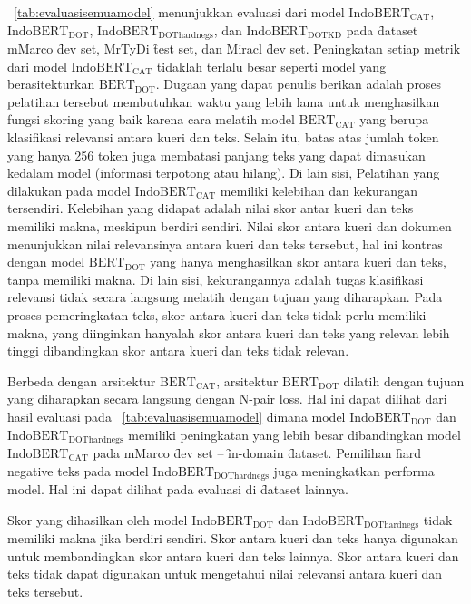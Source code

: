 \tab~\ref{tab:evaluasisemuamodel} menunjukkan evaluasi dari model $\text{IndoBERT}_{\text{CAT}}$, $\text{IndoBERT}_{\text{DOT}}$, $\text{IndoBERT}_{\text{DOThardnegs}}$, dan $\text{IndoBERT}_{\text{DOTKD}}$ pada \f{dataset} mMarco \f{dev set}, MrTyDi \f{test set}, dan Miracl \f{dev set}. Peningkatan setiap metrik dari model $\text{IndoBERT}_{\text{CAT}}$ tidaklah terlalu besar seperti model yang berasitekturkan $\text{BERT}_{\text{DOT}}$. Dugaan yang dapat penulis berikan adalah proses pelatihan tersebut membutuhkan waktu yang lebih lama untuk menghasilkan fungsi skoring yang baik karena cara melatih model $\text{BERT}_{\text{CAT}}$ yang berupa klasifikasi relevansi antara kueri dan teks. Selain itu, batas atas jumlah token yang hanya 256 token juga membatasi panjang teks yang dapat dimasukan kedalam model (informasi terpotong atau hilang). Di lain sisi, Pelatihan yang dilakukan pada model $\text{IndoBERT}_{\text{CAT}}$ memiliki kelebihan dan kekurangan tersendiri. Kelebihan yang didapat adalah nilai skor antar kueri dan teks memiliki makna, meskipun berdiri sendiri. Nilai skor antara kueri dan dokumen menunjukkan nilai relevansinya antara kueri dan teks tersebut, hal ini kontras dengan model $\text{BERT}_{\text{DOT}}$ yang hanya menghasilkan skor antara kueri dan teks, tanpa memiliki makna. Di lain sisi, kekurangannya adalah tugas klasifikasi relevansi tidak secara langsung melatih dengan tujuan yang diharapkan. Pada proses pemeringkatan teks, skor antara kueri dan teks tidak perlu memiliki makna, yang diinginkan hanyalah skor antara kueri dan teks yang relevan lebih tinggi dibandingkan skor antara kueri dan teks tidak relevan. 

Berbeda dengan arsitektur $\text{BERT}_{\text{CAT}}$, arsitektur $\text{BERT}_{\text{DOT}}$ dilatih dengan tujuan yang diharapkan secara langsung dengan \f{N-pair loss}. Hal ini dapat dilihat dari hasil evaluasi pada \tab~\ref{tab:evaluasisemuamodel} dimana model $\text{IndoBERT}_{\text{DOT}}$ dan $\text{IndoBERT}_{\text{DOThardnegs}}$ memiliki peningkatan yang lebih besar dibandingkan model $\text{IndoBERT}_{\text{CAT}}$ pada mMarco \f{dev set} -- \f{in-domain} \f{dataset}. Pemilihan \f{hard negative} teks pada model $\text{IndoBERT}_{\text{DOThardnegs}}$ juga meningkatkan performa model. Hal ini dapat dilihat pada evaluasi di \f{dataset} lainnya.

Skor yang dihasilkan oleh model $\text{IndoBERT}_{\text{DOT}}$ dan $\text{IndoBERT}_{\text{DOThardnegs}}$ tidak memiliki makna jika berdiri sendiri. Skor antara kueri dan teks hanya digunakan untuk membandingkan skor antara kueri dan teks lainnya. Skor antara kueri dan teks tidak dapat digunakan untuk mengetahui nilai relevansi antara kueri dan teks tersebut.

